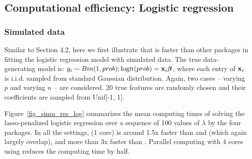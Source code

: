 \subsection{Computational efficiency: Logistic regression}
\subsubsection{Simulated data}

Similar to Section 4.2, here we first illustrate that  is faster than other packages in fitting the logistic regression model with simulated data. The true data-generating model is: $y_i \sim Bin(1, prob); \textrm{logit}(prob) = \mathbf{x}_i \boldsymbol{\beta}$, where each entry of $\mathbf{x}_i$ is i.i.d. sampled from standard Gaussian distribution. Again, two cases -- varying $p$ and varying $n$ -- are considered. 20 true features are randomly chosen and their coefficients are sampled from Unif[-1, 1].

Figure~\ref{fig_simu_res_log} summarizes the mean computing times of solving the lasso-penalized logistic regression over a sequence of 100 values of $\lambda$ by the four packages. In all the settings,  (1 core) is around 1.5x faster than  and  (which again largely overlap), and more than 3x faster than . Parallel computing with 4 cores using  reduces the computing time by half.

